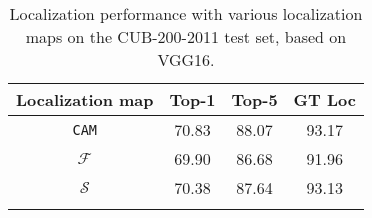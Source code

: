 \begin{table}[t]
\normalsize
  \centering
  
    \begin{tabular}{cccc}
    \Xhline{1pt}
    Localization map & Top-1  & Top-5 & GT Loc \\
    \hline\hline
     \texttt{CAM}  & 70.83 & 88.07 & 93.17 \\
     $\mathcal{F}$  & 69.90 & 86.68 & 91.96 \\
     $\mathcal{S}$  & 70.38 & 87.64 & 93.13 \\
    \Xhline{1pt}
    \end{tabular}%
    \vspace{-0.5em}
    \caption{Localization performance with various localization maps on the CUB-200-2011 test set, based on VGG16.}
  \label{tab:perf_sim_norm_cam}%
\end{table}%

